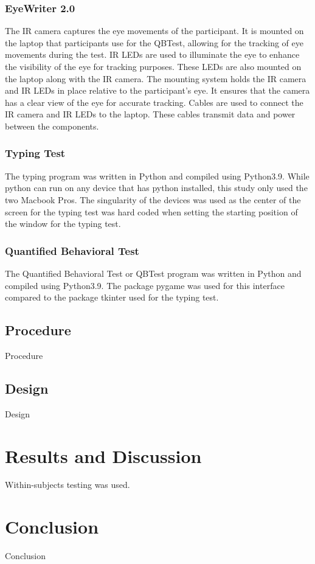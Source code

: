 \documentclass[manuscript, screen, review]{acmart} %
\begin{document}
\subsubsection{EyeWriter 2.0}
The IR camera captures the eye movements of the participant.
It is mounted on the laptop that participants use for the QBTest, allowing for the tracking of eye movements during the test.
IR LEDs are used to illuminate the eye to enhance the visibility of the eye for tracking purposes. 
These LEDs are also mounted on the laptop along with the IR camera. 
The mounting system holds the IR camera and IR LEDs in place relative to the participant's eye. 
It ensures that the camera has a clear view of the eye for accurate tracking. 
Cables are used to connect the IR camera and IR LEDs to the laptop. These cables transmit data and power between the components.
\subsubsection{Typing Test}
The typing program was written in Python and compiled using Python3.9. While python can run on any device that has python installed, this study only used the two Macbook Pros. The singularity of the devices was used as the center of the screen for the typing test was hard coded when setting the starting position of the window for the typing test. 

\subsubsection{Quantified Behavioral Test}
The Quantified Behavioral Test or QBTest program was written in Python and compiled using Python3.9. The package pygame was used for this interface compared to the package tkinter used for the typing test.

\subsection[short]{Procedure}
Procedure 

\subsection[short]{Design}
Design

\section{Results and Discussion}
Within-subjects testing was used.

\section{Conclusion}
Conclusion



\end{document}
